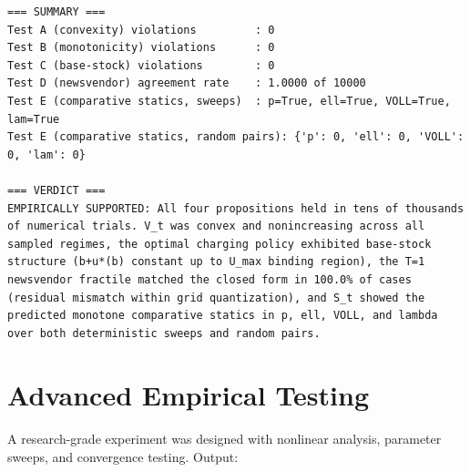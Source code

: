 \documentclass[11pt]{article}
\begin{document}
\begin{lstlisting}
=== SUMMARY ===
Test A (convexity) violations         : 0
Test B (monotonicity) violations      : 0
Test C (base-stock) violations        : 0
Test D (newsvendor) agreement rate    : 1.0000 of 10000
Test E (comparative statics, sweeps)  : p=True, ell=True, VOLL=True, lam=True
Test E (comparative statics, random pairs): {'p': 0, 'ell': 0, 'VOLL': 0, 'lam': 0}

=== VERDICT ===
EMPIRICALLY SUPPORTED: All four propositions held in tens of thousands of numerical trials. V_t was convex and nonincreasing across all sampled regimes, the optimal charging policy exhibited base-stock structure (b+u*(b) constant up to U_max binding region), the T=1 newsvendor fractile matched the closed form in 100.0% of cases (residual mismatch within grid quantization), and S_t showed the predicted monotone comparative statics in p, ell, VOLL, and lambda over both deterministic sweeps and random pairs.

\end{lstlisting}


\section{Advanced Empirical Testing}

A research-grade experiment was designed with nonlinear analysis, parameter sweeps,
and convergence testing. Output:
\end{document}
